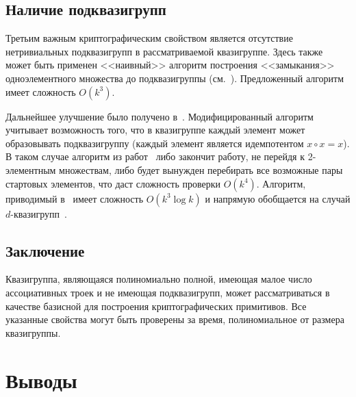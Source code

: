 \subsection{Наличие подквазигрупп}
\label{sec:subquasi}
    Третьим важным криптографическим свойством является отсутствие нетривиальных подквазигрупп в рассматриваемой квазигруппе.
    Здесь также может быть применен <<наивный>> алгоритм построения <<замыкания>> одноэлементного множества до подквазигруппы (см.~\cite{toropov18, sobyanin19}). 
    Предложенный алгоритм имеет сложность $O(k^3)$.

    Дальнейшее улучшение было получено в~\cite{galatenko20subquasi, galatenko21subquasi}. 
    Модифицированный алгоритм учитывает возможность того, что в квазигруппе каждый элемент может образовывать подквазигруппу (каждый элемент является идемпотентом $x \circ x = x$).
    В таком случае алгоритм из работ~\cite{toropov18, sobyanin19} либо закончит работу, не перейдя к 2-элементным множествам, либо будет вынужден перебирать все возможные пары стартовых элементов, что даст сложность проверки $O(k^4)$.
    Алгоритм, приводимый в~\cite{galatenko21subquasi} имеет сложность $O(k^3 \log k)$ и напрямую обобщается на случай $d$-квазигрупп~\cite{galatenko21nsubquasi}.


\subsection{Заключение}

    Квазигруппа, являющаяся полиномиально полной, имеющая малое число ассоциативных троек и не имеющая подквазигрупп, может рассматриваться в качестве базисной для построения криптографических примитивов.
    Все указанные свойства могут быть проверены за время, полиномиальное от размера квазигруппы.


\section*{Выводы}

